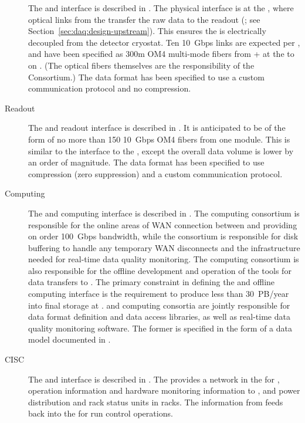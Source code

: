 \begin{description}
\item[ ] The  and   interface is described in
. The physical interface is at the , where optical links from the  transfer
the raw  data to the   readout (; see
Section~\ref{sec:daq:design-upstream}). This ensures the  is electrically decoupled from the detector
cryostat. Ten \SI{10}{Gbps} links are expected per , and have
been specified as 300m OM4 multi-mode fibers from + at the  to
 on . (The optical fibers themselves are
the responsibility of the  Consortium.) The data format has been specified
to use a custom communication protocol and no
compression.

\item[ Readout] The  and  readout interface is described in
. It is anticipated to
be of the form of no more than 150  \SI{10}{Gbps} OM4 fibers from one  module. 
This
is similar to the interface to the  , except the overall
data volume is lower by an order of magnitude. The data format has been specified to use
compression (zero suppression) and a custom communication protocol.

\item[Computing] The  and computing interface is described in .
 The computing consortium
 is responsible for the online areas of WAN connection between \surf and
\fnal providing on order \SI{100}{Gbps} bandwidth, while the  consortium is responsible for disk buffering
to handle any temporary WAN disconnects and the infrastructure needed
for real-time data quality monitoring.  The computing consortium 
is also
responsible for the offline development and operation of the tools for data
transfers to \fnal. The primary
constraint in defining the  and offline computing interface is the
requirement to produce less than \SI{30}{PB/year} 
into final storage at
\fnal.  and
computing consortia are jointly responsible for data
format definition and data access libraries, as well as real-time data
quality monitoring software. The former is specified in the form of a 
data model documented in .

\item[CISC] The  and  interface is described in
. The  provides a network in the  for ,  operation information and hardware
monitoring information to , and power distribution and
rack status units in  racks. The information from 
feeds back into the  for run control operations.


\end{description}
